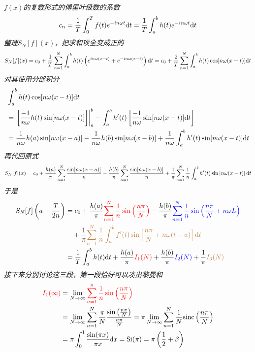\documentclass[main.tex]{subfiles}
\begin{document}
\textit{
    \(f(x)\)的复数形式的傅里叶级数的系数
    \[c_n = \frac{1}{T} \int_{0}^{T} f(t)e^{-in\omega t}{\rm d}t = \frac{1}{T} \int_{a}^{b}h(t)e^{-in\omega t}{\rm d}t\]
    整理\(S_N[f](x)\)，把求和项全变成正的
    \[S_N[f](x) = c_0+\frac{1}{T}\sum_{n=1}^{N}\int_{a}^{b}h(t)\left(e^{in\omega(x-t)}+e^{-in\omega(x-t)}\right){\rm d}t = c_0+\frac{2}{T}\sum_{n=1}^{N}\int_{a}^{b} h(t)\cos[n\omega(x-t)]{\rm d}t\]
    对其使用分部积分
    \begin{align*}
        & \int_{a}^{b}h(t)\cos[n\omega(x-t)]{\rm d}t \\
        &= \left.\left[\frac{-1}{n\omega}h(t)\sin[n\omega(x-t)]\right]\right|_{a}^{b}-\int_{a}^{b} h'(t)\left[\frac{-1}{n\omega}\sin[n\omega(x-t)]{\rm d}t\right] \\
        &= \frac{1}{n\omega}h(a)\sin[n\omega(x-a)] - \frac{1}{n\omega}h(b)\sin[n\omega(x-b)] + \frac{1}{n\omega}\int_{a}^{b}h'(t)\sin[n\omega(x-t)]{\rm d}t
    \end{align*}
    再代回原式
    \[S_N[f](x) = c_0+\frac{h(a)}{\pi}\sum_{n=1}^{N}\frac{\sin[n\omega(x-a)]}{n} - \frac{h(b)}{\pi}\sum_{n=1}^{N}\frac{\sin[n\omega(x-b)]}{n} + \frac{1}{\pi}\sum_{n=1}^{N}\frac{1}{n}\int_{a}^{b}h'(t)\sin\left[n\omega(x-t)\right]{\rm d}t\]
    于是
    \begin{align*}
        S_N[f]\left(a+\frac{T}{2n}\right) &= c_0 +\frac{h(a)}{\pi}{\color{red}\sum_{n=1}^{N}\frac{1}{n}\sin\left(\frac{n\pi}{N}\right)} 
        -\frac{h(b)}{\pi}{\color{blue}\sum_{n=1}^{N}\frac{1}{n}\sin\left(\frac{n\pi}{N}+n\omega L\right)} \\
        & \quad +\frac{1}{\pi}{\color{brown}\sum_{n=1}^{N}\frac{1}{n}\int_{a}^  {b}f'(t)\sin\left[\frac{n\pi}{N}+n\omega(t-a)\right]{\rm d}t} \\
        &= \frac{1}{T}\int_{a}^{b}h(t){\rm d}t + \frac{h(a)}{\pi}{\color{red}I_1(N)}+ \frac{h(b)}{\pi}{\color{blue}I_2(N)} + \frac{1}{\pi}{\color{brown}I_3(N)}
    \end{align*}
    接下来分别讨论这三段，第一段恰好可以凑出黎曼和
    \begin{align*}
        {\color{red}I_1(\infty)} & = \lim_{N \to \infty}{\color{red}\sum_{n=1}^{n}\frac{1}{n}\sin\left(\frac{n\pi}{N}\right)} \\
        &=  \lim_{N \to \infty} \sum_{n=1}^{N}\frac{\pi}{N}\frac{\sin\left(\frac{n\pi}{N}\right)}{\frac{n\pi}{N}}  = \pi \lim_{N\to\infty} \sum_{n=1}^{N}\frac{1}{N}\trm{sinc}\left(\frac{n\pi}{N}\right)\\
        &= \pi\int_{0}^{1}\frac{\sin(\pi x)}{\pi x}\trm{d}x = \trm{Si}(\pi) = \pi\left(\frac{1}{2}+\beta\right)

\end{align*}}
\end{document}
